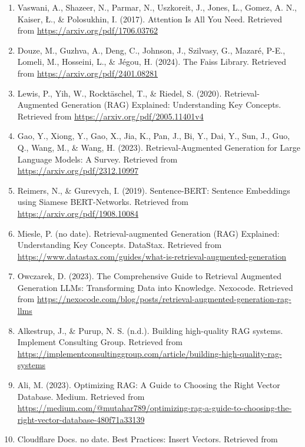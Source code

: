 \documentclass[11pt]{wseas}
\begin{document}
\begin{enumerate}
\def\labelenumi{\arabic{enumi}.}
\item
  Vaswani, A., Shazeer, N., Parmar, N., Uszkoreit, J., Jones, L., Gomez,
  A. N., Kaiser, Ł., \& Polosukhin, I. (2017). Attention Is All You
  Need. Retrieved from \url{https://arxiv.org/pdf/1706.03762}
\item
  Douze, M., Guzhva, A., Deng, C., Johnson, J., Szilvasy, G., Mazaré,
  P-E., Lomeli, M., Hosseini, L., \& Jégou, H. (2024). The Faiss
  Library. Retrieved from \url{https://arxiv.org/pdf/2401.08281}
\item
  Lewis, P., Yih, W., Rocktäschel, T., \& Riedel, S. (2020).
  Retrieval-Augmented Generation (RAG) Explained: Understanding Key
  Concepts. Retrieved from \url{https://arxiv.org/pdf/2005.11401v4}
\item
  Gao, Y., Xiong, Y., Gao, X., Jia, K., Pan, J., Bi, Y., Dai, Y., Sun,
  J., Guo, Q., Wang, M., \& Wang, H. (2023). Retrieval-Augmented
  Generation for Large Language Models: A Survey. Retrieved from
  \url{https://arxiv.org/pdf/2312.10997}
\item
  Reimers, N., \& Gurevych, I. (2019). Sentence-BERT: Sentence
  Embeddings using Siamese BERT-Networks. Retrieved from
  \url{https://arxiv.org/pdf/1908.10084}
\item
  Miesle, P. (no date). Retrieval-augmented Generation (RAG) Explained:
  Understanding Key Concepts. DataStax. Retrieved from
  \url{https://www.datastax.com/guides/what-is-retrieval-augmented-generation}
\item
  Owczarek, D. (2023). The Comprehensive Guide to Retrieval Augmented
  Generation LLMs: Transforming Data into Knowledge. Nexocode. Retrieved
  from
  \url{https://nexocode.com/blog/posts/retrieval-augmented-generation-rag-llms}
\item
  Alkestrup, J., \& Purup, N. S. (n.d.). Building high-quality RAG
  systems. Implement Consulting Group. Retrieved from
  \url{https://implementconsultinggroup.com/article/building-high-quality-rag-systems}
\item
  Ali, M. (2023). Optimizing RAG: A Guide to Choosing the Right Vector
  Database. Medium. Retrieved from
  \href{https://medium.com/@mutahar789/optimizing-rag-a-guide-to-choosing-the-right-vector-database-480f71a33139}{https://medium.com/@mutahar789/optimizing-rag-a-guide-to-choosing-the-right-vector-database-480f71a33139}
\item
  Cloudflare Docs. no date. Best Practices: Insert Vectors. Retrieved
  from

\end{enumerate}
\end{document}
